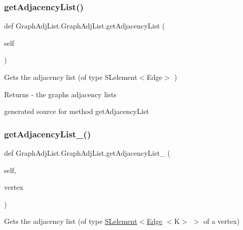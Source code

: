 \subsubsection{\texorpdfstring{get\+Adjacency\+List()}{getAdjacencyList()}}
{\footnotesize\ttfamily def Graph\+Adj\+List.\+Graph\+Adj\+List.\+get\+Adjacency\+List (\begin{DoxyParamCaption}\item[{}]{self }\end{DoxyParamCaption})}



Gets the adjacency list (of type S\+Lelement$<$\+Edge$>$ ) 

\begin{DoxyReturn}{Returns}
-\/ the graph\textquotesingle{}s adjacency lists\begin{DoxyVerb}generated source for method getAdjacencyList \end{DoxyVerb}
 
\end{DoxyReturn}
\hypertarget{class_graph_adj_list_1_1_graph_adj_list_ae446e3a3cd1c8e04faf600ac46dbfddc}{}\label{class_graph_adj_list_1_1_graph_adj_list_ae446e3a3cd1c8e04faf600ac46dbfddc} 
\subsubsection{\texorpdfstring{get\+Adjacency\+List\+\_()}{getAdjacencyList\_0()}}
{\footnotesize\ttfamily def Graph\+Adj\+List.\+Graph\+Adj\+List.\+get\+Adjacency\+List\+\_ (\begin{DoxyParamCaption}\item[{}]{self,  }\item[{}]{vertex }\end{DoxyParamCaption})}



Gets the adjacency list (of type \hyperlink{namespace_s_lelement}{S\+Lelement}$<$\hyperlink{namespace_edge}{Edge} $<$\+K$>$ $>$ of a vertex) 


